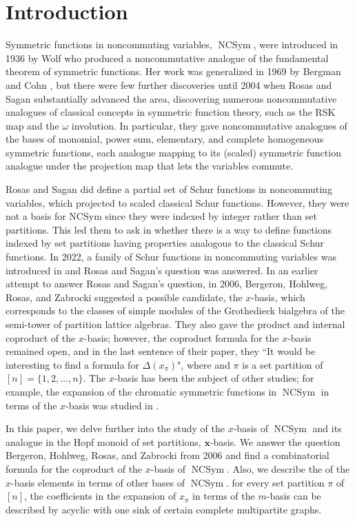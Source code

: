 \documentclass[12pt]{amsart}  %
\theoremstyle{definition}
\theoremstyle{remark}
\numberwithin{equation}{section}
\newcommand{\NCSym}{\ensuremath{\operatorname{NCSym}}}
\newcommand{\mnc}{{m}}           	%
\newcommand{\xnc}{{x}}                 %
\newcommand{\xhm}{\mathbf{x}}
\newcommand\svw[1]{{\color{black}{#1}}}
\begin{document}
\section{Introduction}\label{sec:intro}  
Symmetric functions in noncommuting variables, $\NCSym$, were introduced in 1936 by Wolf \cite{Wolf} who produced a noncommutative analogue of the fundamental theorem of symmetric functions. Her work was generalized in 1969 by Bergman and Cohn \cite{BC}, but there were few further discoveries until 2004 when Rosas and Sagan \cite{RS} substantially advanced the area, discovering numerous noncommutative analogues of classical concepts in symmetric function theory, such as the RSK map and the $\omega$ involution. In particular, they gave noncommutative analogues of the bases of monomial, power sum, elementary, and complete homogeneous symmetric functions, each analogue mapping to its (scaled) symmetric function analogue under the projection map that lets the variables commute. 

 
{Rosas and Sagan did define {a partial set of} Schur functions in noncommuting variables, which projected to scaled classical Schur functions.  However, they were not a basis for NCSym since they were indexed by integer \svw{partitions} rather than \svw{by} set partitions.} This led them to ask in \cite[Section 9]{RS} whether there is a way to define functions indexed by set partitions having properties analogous to the classical Schur functions. In 2022, a family of Schur functions in noncommuting variables was introduced in \cite{ALvW22} and Rosas and Sagan's question was answered.  In an earlier attempt to answer Rosas and Sagan's question, in 2006, Bergeron, Hohlweg, Rosas, and Zabrocki \cite{BHRZ} suggested a possible candidate, the $\xnc$-basis, which corresponds to the classes of simple modules of the Grothedieck bialgebra of the semi-tower of partition lattice algebras. They also gave the product and internal coproduct of the $x$-basis; however, the coproduct formula for the $x$-basis remained open, and in the last sentence of their paper, they \svw{stated that}  ``It would be interesting to find a formula for $\Delta(x_\pi)$", where \svw{$\Delta$ denotes the coproduct} and $\pi$ is a set partition of $[n]=\{1,2,\dots, n\}$. The $x$-basis has been the subject of other studies; for example,
the expansion of the chromatic symmetric functions in $\NCSym$ in terms of the $x$-basis was studied in  \cite{DvW}.
 



In this paper,  we delve further into the study of the $x$-basis of $\NCSym$ and its analogue in the Hopf monoid of set partitions, \svw{the} $\xhm$-basis. We answer the question \svw{of} Bergeron, Hohlweg, Rosas, and Zabrocki from 2006 and find a combinatorial formula for the coproduct of the $\xnc$-basis of $\NCSym$. Also, we describe the \svw{expansion} of the $\xnc$-basis elements in terms of other bases of $\NCSym$. \svw{In particular,} for every set partition $\pi$ of $[n]$, the coefficients in the expansion of $\xnc_\pi$ in terms of the $\mnc$-basis can be described by acyclic \svw{orientations} with one sink of certain complete multipartite graphs.
\end{document}
